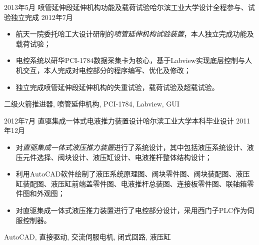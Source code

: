 \begin{experiences}
	\emptySeparator
	\experience
	{2013年5月} {喷管延伸段延伸机构功能及载荷试验}{哈尔滨工业大学}{设计全程参与、试验独立完成}
	{2012年7月}    {
		\begin{itemize}
			\item 航天一院委托哈工大设计研制的\emph{喷管延伸机构试验装置}，本人独立完成功能及载荷试验；
			\item 电控系统以研华PCI-1784数据采集卡为核心，基于Labview实现底层控制与人机交互，本人完成对电控部分的程序编写、优化及修改；
			\item 独立完成喷管延伸段延伸机构的失重试验，载荷试验及超载试验。
		\end{itemize}
	}
	{二级火箭推进器, 喷管延伸机构, PCI-1784, Labview, GUI}

	\emptySeparator
	\experience
	{2012年7月} {直驱集成一体式电液推力装置设计}{哈尔滨工业大学}{本科毕业设计}
	{2011年12月}    {
	 	\begin{itemize}
	 		\item 对\emph{直驱集成一体式液压推力装置}进行了系统设计，其中包括液压系统设计、液压元件选择、阀块设计、液压缸设计、电液推杆整体结构设计；
	 		\item 利用AutoCAD软件绘制了液压系统原理图、阀块零件图、阀块装配图、液压缸装配图、液压缸前端盖零件图、电液推杆总装图、连接板零件图、联轴箱零件图和外观图；
	 		\item 对直驱集成一体式液压推力装置进行了电控部分设计，采用西门子PLC作为伺服控制器。
	 	\end{itemize}
	}
	{AutoCAD, 直接驱动, 交流伺服电机, 闭式回路, 液压缸}
		
\end{experiences}
